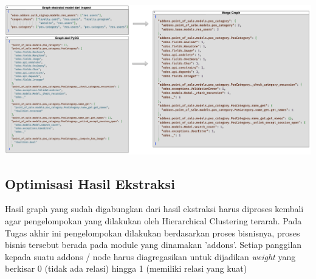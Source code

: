 \begin{center}
	\includegraphics[width=14cm]{img/bab_4/ekstraksi_5.png}
	\label{fig:ekstraksi_5}
\end{center}

\subsection{Optimisasi Hasil Ekstraksi}
Hasil graph yang sudah digabungkan dari hasil ekstraksi harus diproses kembali agar pengelompokan yang dilakukan oleh Hierarchical Clustering terarah. Pada Tugas akhir ini pengelompokan dilakukan berdasarkan proses bisnisnya, proses bisnis tersebut berada pada module yang dinamakan 'addons'. Setiap panggilan kepada suatu addons / node harus diagregasikan untuk dijadikan \textit{weight} yang berkisar 0 (tidak ada relasi) hingga 1 (memiliki relasi yang kuat)


